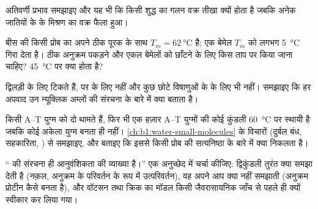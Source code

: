 \begin{exercise}[$\star\star$]\label{exo:b1:nucleic-acids:8}
अतिवर्णी प्रभाव समझाइए और यह भी कि किसी शुद्ध  का गलन वक्र तीखा क्यों
होता है जबकि अनेक जातियों के  के मिश्रण का वक्र फैला हुआ।
\end{exercise}

\begin{exercise}[$\star\star$]\label{exo:b1:nucleic-acids:9}
बीस  की किसी प्रोब का अपने ठीक पूरक के साथ
$T_m = \qty{62}{\celsius}$ है; एक बेमेल $T_m$ को लगभग \qty{5}{\celsius}
गिरा देता है। ठीक अनुक्रम पकड़ने और एकल बेमेलों को छाँटने के लिए 
किस ताप पर किया जाना चाहिए? \qty{45}{\celsius} पर क्या होता है?
\end{exercise}

\begin{exercise}[$\star\star\star$]\label{exo:b1:nucleic-acids:10}
 द्विलड़ी  के लिए टिकते हैं, पर  के लिए नहीं और कुछ
छोटे विषाणुओं के  के लिए भी नहीं। समझाइए कि हर अपवाद उन न्यूक्लिक
अम्लों की संरचना के बारे में क्या बताता है।
\end{exercise}

\begin{exercise}[$\star\star\star$]\label{exo:b1:nucleic-acids:11}
किसी A--T युग्म को दो  थामते हैं, फिर भी एक हज़ार A--T
युग्मों की कोई कुंडली \qty{60}{\celsius} पर स्थायी है जबकि कोई अकेला
युग्म बनता ही नहीं। \cref{ch:b1:water-small-molecules} के विचारों
(दुर्बल बंध, सहकारिता, ) से समझाइए, और बताइए कि इससे किसी प्रोब की
सत्यनिष्ठा के बारे में क्या निकलता है।
\end{exercise}

\begin{exercise}[$\star\star\star$]\label{exo:b1:nucleic-acids:12}
`` की संरचना ही आनुवंशिकता की व्याख्या है।'' एक अनुच्छेद में चर्चा
कीजिए: द्विकुंडली तुरंत क्या समझा देती है (नक़ल, अनुक्रम के परिवर्तन के
रूप में उत्परिवर्तन), वह अपने आप क्या नहीं समझाती (अनुक्रम प्रोटीन कैसे
बनता है), और वॉटसन तथा क्रिक का मॉडल किसी जैवरासायनिक जाँच से पहले ही
क्यों स्वीकार कर लिया गया।
\end{exercise}

